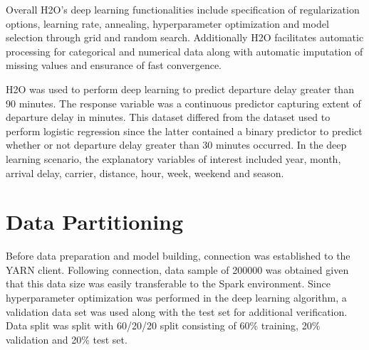 \documentclass[12pt,twoside]{amherstthesis}
\begin{document}
  Overall H2O's deep learning functionalities include specification of
  regularization options, learning rate, annealing, hyperparameter
  optimization and model selection through grid and random search.
  Additionally H2O facilitates automatic processing for categorical and
  numerical data along with automatic imputation of missing values and
  ensurance of fast convergence.
  
  H2O was used to perform deep learning to predict departure delay greater
  than 90 minutes. The response variable was a continuous predictor
  capturing extent of departure delay in minutes. This dataset differed
  from the dataset used to perform logistic regression since the latter
  contained a binary predictor to predict whether or not departure delay
  greater than 30 minutes occurred. In the deep learning scenario, the
  explanatory variables of interest included year, month, arrival delay,
  carrier, distance, hour, week, weekend and season.
  
  \clearpage 
  
  \section{Data Partitioning}\label{data-partitioning-2}
  
  Before data preparation and model building, connection was established
  to the YARN client. Following connection, data sample of 200000 was
  obtained given that this data size was easily transferable to the Spark
  environment. Since hyperparameter optimization was performed in the deep
  learning algorithm, a validation data set was used along with the test
  set for additional verification. Data split was split with 60/20/20
  split consisting of 60\% training, 20\% validation and 20\% test set.
  
  \begin{Shaded}
  \end{Shaded}
  
\end{document}
